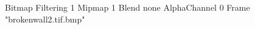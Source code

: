 {Bitmap
	{Filtering 1}
	{Mipmap 1}
	{Blend none}
	{AlphaChannel 0}
	{Frame "brokenwall2.tif.bmp"}
}
